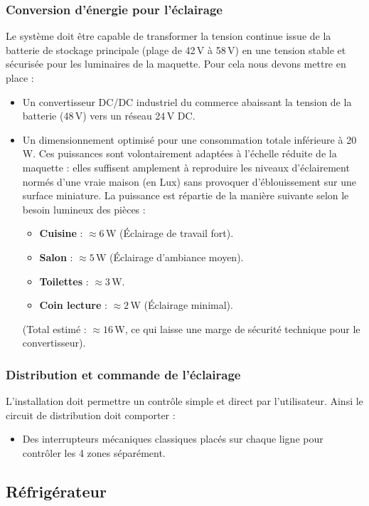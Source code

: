 \subsubsection{Conversion d'énergie pour l'éclairage}
Le système doit être capable de transformer la tension continue issue de la batterie de stockage principale (plage de 42\,V à 58\,V) en une tension stable et sécurisée pour les luminaires de la maquette. Pour cela nous devons mettre en place :
\begin{itemize}
    \item Un convertisseur DC/DC industriel du commerce abaissant la tension de la batterie (48\,V) vers un réseau 24\,V DC.
    \item Un dimensionnement optimisé pour une consommation totale inférieure à 20\,W. Ces puissances sont volontairement adaptées à l'échelle réduite de la maquette : elles suffisent amplement à reproduire les niveaux d'éclairement normés d'une vraie maison (en Lux) sans provoquer d'éblouissement sur une surface miniature. La puissance est répartie de la manière suivante selon le besoin lumineux des pièces :
    \begin{itemize}
        \item \textbf{Cuisine} : $\approx 6$\,W (Éclairage de travail fort).
        \item \textbf{Salon} : $\approx 5$\,W (Éclairage d'ambiance moyen).
        \item \textbf{Toilettes} : $\approx 3$\,W.
        \item \textbf{Coin lecture} : $\approx 2$\,W (Éclairage minimal).
    \end{itemize}
    (Total estimé : $\approx 16$\,W, ce qui laisse une marge de sécurité technique pour le convertisseur).
\end{itemize}

\subsubsection{Distribution et commande de l'éclairage}
L'installation doit permettre un contrôle simple et direct par l'utilisateur. Ainsi le circuit de distribution doit comporter :
\begin{itemize}
    \item Des interrupteurs mécaniques classiques placés sur chaque ligne pour contrôler les 4 zones séparément.
\end{itemize}

\subsection{Réfrigérateur}

